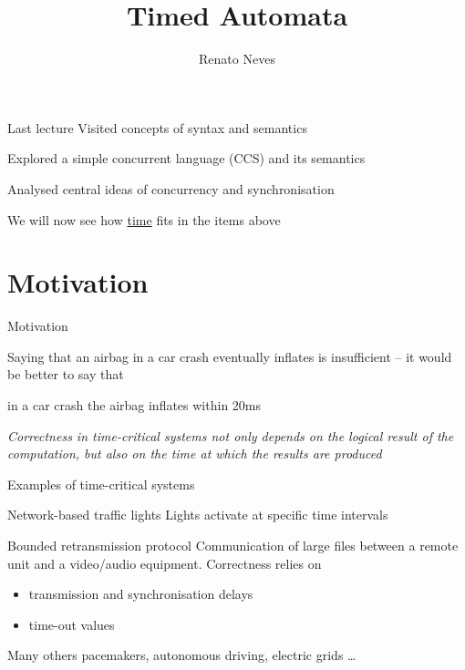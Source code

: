 \documentclass{beamer}
\author[Renato Neves]{Renato Neves}
\date{}
\begin{document}
\title{Timed Automata}

\frame[plain]{\titlepage}

\begin{frame}{Last lecture}
  Visited concepts of \alert{syntax} and \alert{semantics}

  Explored a simple concurrent language (CCS) and its semantics

  Analysed central ideas of \alert{concurrency} and \alert{synchronisation}

  \vfill
  We will now see how \alert{\underline{time}} fits in the items above
\end{frame}
\section{Motivation}
\begin{slide}{Motivation}


Saying that an airbag in a car crash \alert{eventually
inflates} is insufficient -- it would be better to say that
\begin{center}
 in a car crash the airbag inflates \alert{within 20ms}
\end{center}
 
\vfill
\emph{Correctness in time-critical systems not only depends on
    the logical result of the computation, but also \alert{on the time
      at which the results are produced}}
\begin{flushright}
\end{flushright}
\end{slide}

\begin{slide}{Examples of time-critical systems}

\begin{block}{Network-based traffic lights}
  Lights activate at specific time intervals
\end{block}

\begin{block}{Bounded retransmission  protocol}
  Communication of large files between a remote unit and a
  video/audio equipment. Correctness relies on
\begin{itemize}
\item transmission and synchronisation delays
\item time-out values 
\end{itemize}
\end{block}

\begin{block}{Many others}
pacemakers, autonomous driving, electric grids
\dots
\end{block}
\end{slide}
\end{document}
